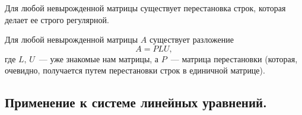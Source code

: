 \begin{claim}
	Для любой невырожденной матрицы существует перестановка строк, которая делает ее строго регулярной.
\end{claim}

\begin{next0}
	Для любой невырожденной матрицы $A$ существует разложение
	\[
		A = PLU,
	\]
	где $L,\, U$~--- уже знакомые нам матрицы, а $P$~--- матрица перестановки (которая, очевидно,
	получается путем перестановки строк в единичной матрице).
\end{next0}

\subsection{Применение к системе линейных уравнений.}

